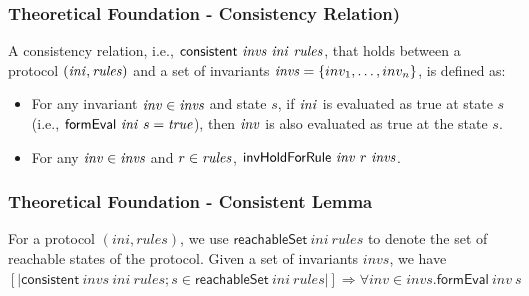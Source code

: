 \documentclass{beamer}
\begin{document}
\begin{frame}\frametitle{Theoretical Foundation - Consistency Relation)}


\begin{definition}
A consistency relation, i.e., $\mathsf{consistent}~ {\it invs} ~{\it ini}~ {\it rules}$,
that holds between a protocol $({\it ini}, {\it rules})$ and
a set of invariants ${\it invs}=\{inv_1,\ldots, inv_n\}$,  is defined as:
%
\begin{itemize}
\item For any invariant ${\it inv} \in {\it invs}$ and state $s$,
if ${\it ini}$ is
evaluated as true at state $s$
(i.e., $\mathsf{formEval}~{\it ini}~s={\it true}$), then ${\it inv}$ is also evaluated as true at the state $s$.

\item For any ${\it inv} \in {\it invs}$ and $r\in {\it rules}$,
$\mathsf{invHoldForRule}~{\it inv}~r~{\it invs}$.
\end{itemize}
\end{definition}


\end{frame}




\begin{frame}\frametitle{Theoretical Foundation - Consistent Lemma}

\begin{lemma}\label{consistentLemma}%
For a protocol $( ini,  rules)$,
we use $\mathsf{reachableSet}~   ini~ rules$
to denote the set of reachable states of the protocol.
Given a set of invariants $ invs$,
we have
$[| \mathsf{consistent}~  invs ~ ini~  rules;
  s \in \mathsf{reachableSet}~  ini~rules|]\Longrightarrow
  \forall  inv \in invs. \mathsf{formEval}~ inv ~s$
\end{lemma}
\end{frame}
\end{document}
